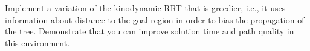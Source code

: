\question{[15]}

Implement a variation of the kinodynamic RRT that is greedier, i.e., it uses
information about distance to the goal region in order to bias the
propagation of the tree. Demonstrate that you can improve solution time and
path quality in this environment.